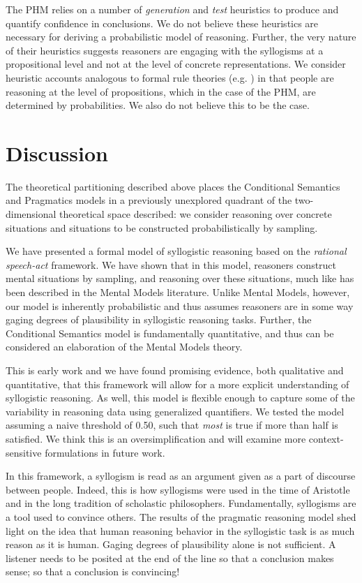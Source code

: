\documentclass[10pt,letterpaper]{article}
\begin{document}
The PHM relies on a number of {\em generation} and {\em test} heuristics to produce and quantify confidence in conclusions. We do not believe these heuristics are necessary for deriving a probabilistic model of reasoning. Further, the very nature of their heuristics suggests reasoners are engaging with the syllogisms at a propositional level and not at the level of concrete representations. We consider heuristic accounts analogous to formal rule theories (e.g. \cite{rips1994}) in that people are reasoning at the level of propositions, which in the case of the PHM, are determined by probabilities. We also do not believe this to be the case.

\section{Discussion}

The theoretical partitioning described above places the Conditional Semantics and Pragmatics models in a previously unexplored quadrant of the two-dimensional theoretical space described: we consider reasoning over concrete situations and situations to be constructed probabilistically by sampling.

We have presented a formal model of syllogistic reasoning based on the \emph{rational speech-act} framework. We have shown that in this model, reasoners construct mental situations by sampling, and reasoning over these situations, much like has been described in the Mental Models literature. Unlike Mental Models, however, our model is inherently probabilistic and thus assumes reasoners are in some way gaging degrees of plausibility in syllogistic reasoning tasks. Further, the Conditional Semantics model is fundamentally quantitative, and thus can be considered an elaboration of the Mental Models theory.

This is early work and we have found promising evidence, both qualitative and quantitative, that this framework will allow for a more explicit understanding of syllogistic reasoning. As well, this model is flexible enough to capture some of the variability in reasoning data using generalized quantifiers. We tested the model assuming a naive threshold of 0.50, such that \emph{most} is true if more than half is satisfied. We think this is an oversimplification and will examine more context-sensitive formulations in future work.

In this framework, a syllogism is read as an argument given as a part of discourse between people. Indeed, this is how syllogisms were used in the time of Aristotle and in the long tradition of scholastic philosophers. Fundamentally, syllogisms are a tool used to convince others. The results of the pragmatic reasoning model shed light on the idea that human reasoning behavior in the syllogistic task is as much reason as it is human. Gaging degrees of plausibility alone is not sufficient. A listener needs to be posited at the end of the line so that a conclusion makes sense; so that a conclusion is convincing!
\end{document}
